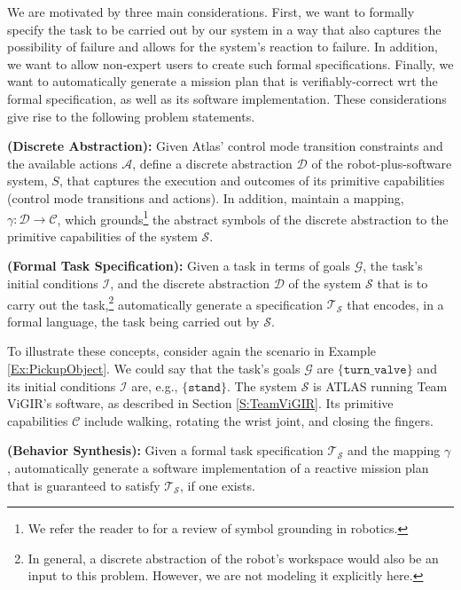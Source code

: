
We are motivated by three main considerations.
First, we want to formally specify the task to be carried out by our system in a way that also captures the possibility of failure and allows for the system's reaction to failure.
In addition, we want to allow non-expert users to create such formal specifications.
Finally, we want to automatically generate a mission plan that is verifiably-correct \ac{wrt} the formal specification, as well as its software implementation.
These considerations give rise to the following problem statements.

\begin{myProblem}\label{DiscreteAbstractionProblem}
\textbf{(Discrete Abstraction):}
Given Atlas' control mode transition constraints and the available actions $\mathcal{A}$, define a discrete abstraction $\mathcal{D}$ of the robot-plus-software system, $S$, that captures the execution and outcomes of its primitive capabilities (control mode transitions and actions).
In addition, maintain a mapping, $\gamma: \mathcal{D} \rightarrow \mathcal{C}$, which grounds\footnote{We refer the reader to \cite{Grounding2013} for a review of symbol grounding in robotics.}
 the abstract symbols of the discrete abstraction to the primitive capabilities of the system $\mathcal{S}$.
\end{myProblem}

\begin{myProblem}\label{SpecificationProblem}
\textbf{(Formal Task Specification):}
Given a task in terms of goals $\mathcal{G}$, the task's initial conditions $\mathcal{I}$, and the discrete abstraction $\mathcal{D}$ of the system $\mathcal{S}$ that is to carry out the task,\footnote{In general, a discrete abstraction of the robot's workspace would also be an input to this problem. However, we are not modeling it explicitly here.}
 automatically generate a specification $\mathcal{T}_\mathcal{S}$ that encodes, in a formal language, the task being carried out by $\mathcal{S}$.
\end{myProblem}

To illustrate these concepts, consider again the scenario in Example \ref{Ex:PickupObject}. 
We could say that the task's goals $\mathcal{G}$ are $\{ \mathtt{turn\_valve} \}$ and its initial conditions $\mathcal{I}$ are, e.g., $\{ \mathtt{stand} \}$.
The system $\mathcal{S}$ is ATLAS running Team ViGIR's software, as described in Section \ref{S:TeamViGIR}.
Its primitive capabilities $\mathcal{C}$ include walking, rotating the wrist joint, and closing the fingers.

\begin{myProblem}\label{BehaviorSynthesisProblem}
\textbf{(Behavior Synthesis):}
Given a formal task specification $\mathcal{T}_\mathcal{S}$ and the mapping $\gamma$, automatically generate a software implementation of a reactive mission plan that is guaranteed to satisfy $\mathcal{T}_\mathcal{S}$, if one exists.
\end{myProblem}

